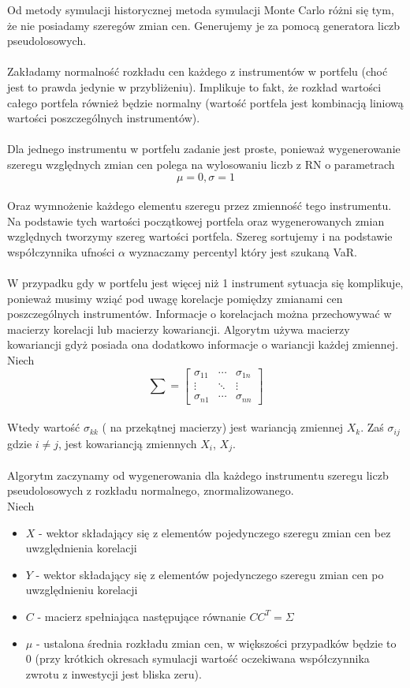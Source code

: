 \documentclass[11pt,titlepage]{article}
\numberwithin{equation}{section}
\begin{document}
Od metody symulacji historycznej  metoda symulacji Monte Carlo różni się tym, że nie posiadamy szeregów zmian cen. Generujemy je za pomocą generatora liczb pseudolosowych.
\\
\\
Zakładamy normalność rozkładu cen każdego z instrumentów w portfelu (choć jest to prawda jedynie w przybliżeniu).  Implikuje to fakt, że rozkład wartości całego portfela również będzie normalny (wartość portfela jest kombinacją liniową wartości poszczególnych instrumentów).
\\
\\
Dla jednego instrumentu w portfelu zadanie jest proste, ponieważ wygenerowanie szeregu względnych zmian cen polega na wylosowaniu liczb z RN o parametrach
$$\mu =0, \sigma =1 $$
\\
Oraz wymnożenie każdego elementu szeregu przez zmienność tego instrumentu. Na podstawie tych wartości początkowej portfela oraz wygenerowanych zmian względnych tworzymy szereg wartości portfela. Szereg sortujemy i na podstawie współczynnika ufności $\alpha$ wyznaczamy percentyl który jest szukaną VaR.
\\
\\
W przypadku gdy w portfelu jest więcej niż 1 instrument sytuacja się komplikuje, ponieważ musimy wziąć pod uwagę korelacje pomiędzy zmianami cen poszczególnych instrumentów.  Informacje o korelacjach można przechowywać w macierzy korelacji lub macierzy kowariancji. Algorytm używa macierzy kowariancji gdyż posiada ona dodatkowo informacje o wariancji każdej zmiennej.
\\
Niech
$$
\sum =\begin{bmatrix}
\sigma_{11} & \cdots  & \sigma_{1n}\\ 
 \vdots & \ddots  & \vdots \\ 
 \sigma_{n1}& \cdots  & \sigma_{nn}
\end{bmatrix}
$$
\\
Wtedy wartość $ \sigma_{kk} $ ( na przekątnej macierzy) jest wariancją zmiennej $ X_{k} $.
Zaś $ \sigma_{ij} $ gdzie $ i \neq j $, jest kowariancją zmiennych $ X_i $,  $ X_j $.
\\
\\
Algorytm zaczynamy od wygenerowania dla każdego instrumentu szeregu liczb pseudolosowych z rozkładu normalnego, znormalizowanego.  
\\
Niech 
\begin{itemize}
  \item $  X $ - wektor składający się z elementów pojedynczego szeregu zmian cen bez uwzględnienia korelacji
	\item $ Y $ - wektor składający się z elementów pojedynczego szeregu zmian cen po uwzględnieniu korelacji
	\item $ C  $ - macierz spełniająca następujące równanie $ C  C^{T} = \Sigma $
	\item $  \mu $ - ustalona średnia rozkładu zmian cen, w większości przypadków będzie to 0 (przy krótkich okresach symulacji wartość oczekiwana współczynnika zwrotu z inwestycji jest bliska zeru).

\end{itemize}
\end{document}
